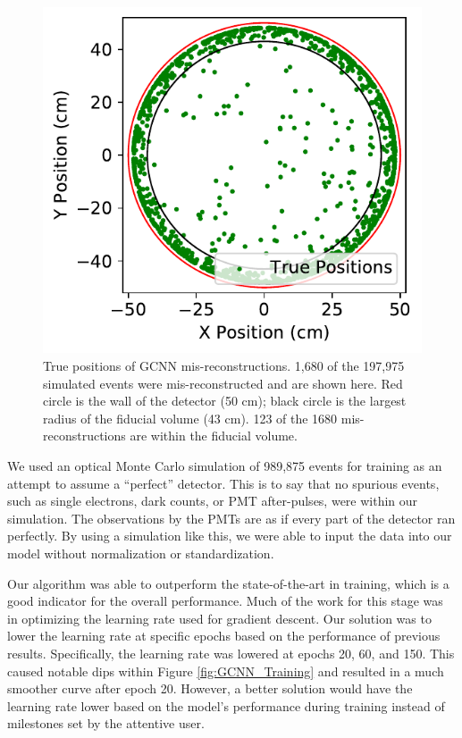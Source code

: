 \documentclass[thesis.tex]{subfiles}
\begin{document}
\begin{figure}
	\centering
	\includegraphics[width=\linewidth]{figures/gcnn_Delaunay-Prenoise_1cm-err.pdf}
	\caption{
	True positions of GCNN mis-reconstructions.
	1,680 of the 197,975 simulated events were mis-reconstructed and are shown here.
	Red circle is the wall of the detector (50 cm); black circle is the largest radius of the fiducial volume (43 cm).
	123 of the 1680 mis-reconstructions are within the fiducial volume.
	}
	\label{fig:1cm_Counts}
\end{figure}
\par We used an optical Monte Carlo simulation of 989,875 events for training as an attempt to assume a “perfect” detector.
This is to say that no spurious events, such as single electrons, dark counts, or PMT after-pulses, were within our simulation.
The observations by the PMTs are as if every part of the detector ran perfectly.
By using a simulation like this, we were able to input the data into our model without normalization or standardization.
\par Our algorithm was able to outperform the state-of-the-art in training, which is a good indicator for the overall performance.
Much of the work for this stage was in optimizing the learning rate used for gradient descent.
Our solution was to lower the learning rate at specific epochs based on the performance of  previous results.
Specifically, the learning rate was lowered at epochs 20, 60, and 150.
This caused notable dips within Figure \ref{fig:GCNN_Training} and resulted in a much smoother curve after epoch 20.
However, a better solution would have the learning rate lower based on the model's performance during training instead of milestones set by the attentive user.
\end{document}
